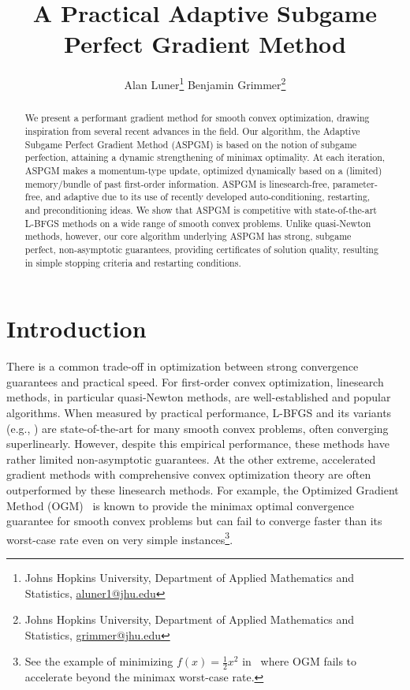 \documentclass[11pt]{article}
\numberwithin{equation}{section}
\theoremstyle{definition}
\theoremstyle{plain}
\theoremstyle{definition}
\begin{document}
    
    \title{A Practical Adaptive Subgame Perfect Gradient Method}

    \author{Alan Luner\footnote{Johns Hopkins University, Department of Applied Mathematics and Statistics, \url{aluner1@jhu.edu}} \qquad Benjamin Grimmer\footnote{Johns Hopkins University, Department of Applied Mathematics and Statistics, \url{grimmer@jhu.edu}}}
    \date{}
    \maketitle
    \begin{abstract}
We present a performant gradient method for smooth convex optimization, drawing inspiration from several recent advances in the field. Our algorithm, the Adaptive Subgame Perfect Gradient Method (ASPGM) is based on the notion of subgame perfection, attaining a dynamic strengthening of minimax optimality. At each iteration, ASPGM makes a momentum-type update, optimized dynamically based on a (limited) memory/bundle of past first-order information. ASPGM is linesearch-free, parameter-free, and adaptive due to its use of recently developed auto-conditioning, restarting, and preconditioning ideas. We show that ASPGM is competitive with state-of-the-art L-BFGS methods on a wide range of smooth convex problems. Unlike quasi-Newton methods, however, our core algorithm underlying ASPGM has strong, subgame perfect, non-asymptotic guarantees, providing certificates of solution quality, resulting in simple stopping criteria and restarting conditions.
    \end{abstract}

\section{Introduction}
There is a common trade-off in optimization between strong convergence guarantees and practical speed. For first-order convex optimization, linesearch methods, in particular quasi-Newton methods, are well-established and popular algorithms. When measured by practical performance, L-BFGS \cite{LBFGS_Nocedal} and its variants (e.g., \cite{LBFGSB_Zhu,oLBFGS_Schraudloph}) are state-of-the-art for many smooth convex problems, often converging superlinearly. However, despite this empirical performance, these methods have rather limited non-asymptotic guarantees. At the other extreme, accelerated gradient methods with comprehensive convex optimization theory are often outperformed by these linesearch methods. For example, the Optimized Gradient Method (OGM)~\cite{OGM} is known to provide the minimax optimal convergence guarantee for smooth convex problems but can fail to converge faster than its worst-case rate even on very simple instances\footnote{See the example of minimizing $f(x)=\tfrac{1}{2}x^2$ in~\cite{SPGM} where OGM fails to accelerate beyond the minimax worst-case rate.}.
\end{document}
